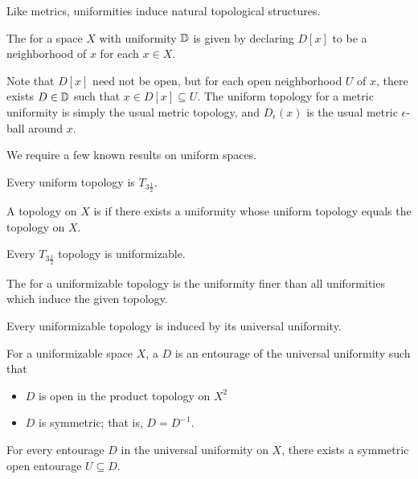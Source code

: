 Like metrics, uniformities induce natural topological structures.

\begin{defn}
  The  for a space $X$ with uniformity $\mathbb{D}$ is given
  by declaring $D[x]$ to be a neighborhood of $x$ for each $x\in X$.
\end{defn}

Note that $D[x]$ need not be open, but for each open neighborhood $U$ of $x$,
there exists $D\in\mathbb{D}$ such that $x\in D[x]\subseteq U$. The uniform topology
for a metric uniformity is simply the usual metric topology, and $D_\epsilon(x)$
is the usual metric $\epsilon$-ball around $x$.

We require a few known results on uniform spaces.

\begin{thm}
  Every uniform topology is $T_{3\frac{1}{2}}$.
\end{thm}

\begin{defn}
  A topology on $X$ is  if there exists
  a uniformity whose uniform topology equals the topology on $X$.
\end{defn}

\begin{thm}
  Every $T_{3\frac{1}{2}}$ topology is uniformizable.
\end{thm}

\begin{defn}
  The  for a uniformizable topology is the uniformity
  finer than all uniformities which induce the given topology.
\end{defn}

\begin{thm}
  Every uniformizable topology is induced by its universal uniformity.
\end{thm}

\begin{defn}
  For a uniformizable space $X$, a  $D$ is an
  entourage of the universal uniformity such that
  \begin{itemize}
    \item $D$ is open in the product topology on $X^2$
    \item $D$ is symmetric; that is, $D=D^{-1}$.
  \end{itemize}
\end{defn}

\begin{thm}
  For every entourage $D$ in the universal uniformity on $X$, there exists a
  symmetric open entourage $U\subseteq D$.
\end{thm}

